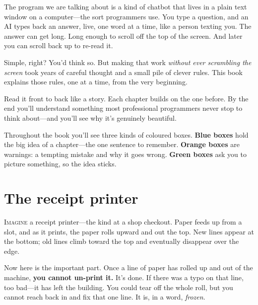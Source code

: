 \documentclass[11pt,twoside]{book}
\begin{document}
The program we are talking about is a kind of chatbot that lives in a
plain text window on a computer---the sort programmers use. You type a
question, and an AI types back an answer, live, one word at a time, like a
person texting you. The answer can get long. Long enough to scroll off the
top of the screen. And later you can scroll back up to re-read it.

Simple, right? You'd think so. But making that work \emph{without ever
scrambling the screen} took years of careful thought and a small pile of
clever rules. This book explains those rules, one at a time, from the very
beginning.

Read it front to back like a story. Each chapter builds on the one before.
By the end you'll understand something most professional programmers never
stop to think about---and you'll see why it's genuinely beautiful.

\begin{pic}
Throughout the book you'll see three kinds of coloured boxes.
\textcolor{notebluerule}{\textbf{Blue boxes}} hold the big idea of a
chapter---the one sentence to remember.
\textcolor{warmrule}{\textbf{Orange boxes}} are warnings: a tempting
mistake and why it goes wrong.
\textcolor{greenrule}{\textbf{Green boxes}} ask you to picture something,
so the idea sticks.
\end{pic}

\tableofcontents

\mainmatter
\pagestyle{fancy}

\chapter{The receipt printer}
\lettrine{I}{magine} a receipt printer---the kind at a shop checkout. Paper
feeds up from a slot, and as it prints, the paper rolls upward and out the
top. New lines appear at the bottom; old lines climb toward the top and
eventually disappear over the edge.

Now here is the important part. Once a line of paper has rolled up and out
of the machine, \textbf{you cannot un-print it.} It's done. If there was a
typo on that line, too bad---it has left the building. You could tear off
the whole roll, but you cannot reach back in and fix that one line. It is,
in a word, \emph{frozen}.
\end{document}
